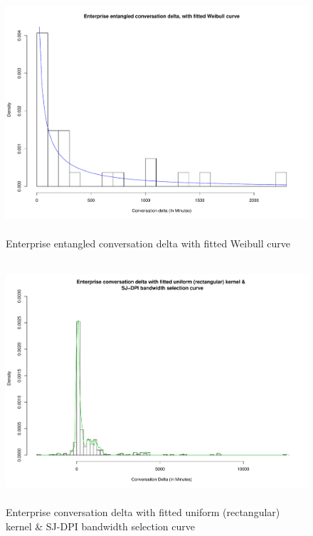 \begin{figure}
\begin{center}
\caption{Enterprise entangled conversation delta with fitted Weibull curve}
\label{fig:chapt6fig4}
\includegraphics[height=9cm, width=13cm]{graphs/different/04_delta_entangled_enterprise.pdf} 
\end{center}
\end{figure}

\begin{figure}
\begin{center}
\caption{Enterprise conversation delta with fitted uniform (rectangular) kernel & \n SJ-DPI bandwidth selection curve}
\label{fig:chapt6fig5}
\includegraphics[height=9cm, width=13cm]{graphs/different/05_delta_kde_enterprise.pdf}
\end{center}
\end{figure}


